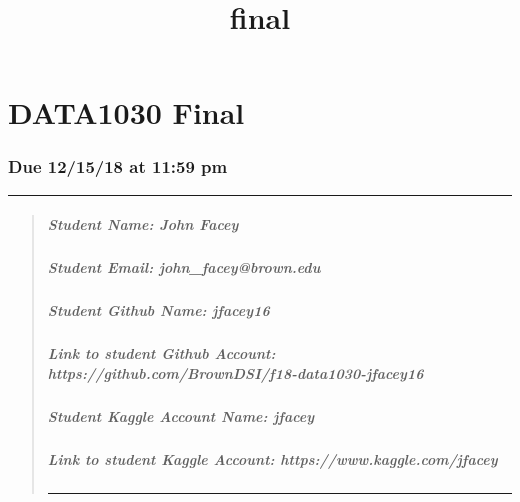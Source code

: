 \documentclass[11pt]{article}
\title{final}
\begin{document}
    
    
    \maketitle
    
    

    
    \section{DATA1030 Final}\label{data1030-final}

\subsubsection{Due 12/15/18 at 11:59 pm}\label{due-121518-at-1159-pm}

\begin{center}\rule{0.5\linewidth}{\linethickness}\end{center}

\begin{quote}
\mbox{}%
\subparagraph{Student Name: John Facey}\label{student-name-john-facey}

\mbox{}%
\subparagraph{Student Email:
john\_facey@brown.edu}\label{student-email-john_faceybrown.edu}

\mbox{}%
\subparagraph{Student Github Name:
jfacey16}\label{student-github-name-jfacey16}

\mbox{}%
\subparagraph{Link to student Github Account:
https://github.com/BrownDSI/f18-data1030-jfacey16}\label{link-to-student-github-account-httpsgithub.combrowndsif18-data1030-jfacey16}

\mbox{}%
\subparagraph{Student Kaggle Account Name:
jfacey}\label{student-kaggle-account-name-jfacey}

\mbox{}%
\subparagraph{Link to student Kaggle Account:
https://www.kaggle.com/jfacey}\label{link-to-student-kaggle-account-httpswww.kaggle.comjfacey}

\begin{center}\rule{0.5\linewidth}{\linethickness}\end{center}
\end{quote}
\end{document}

